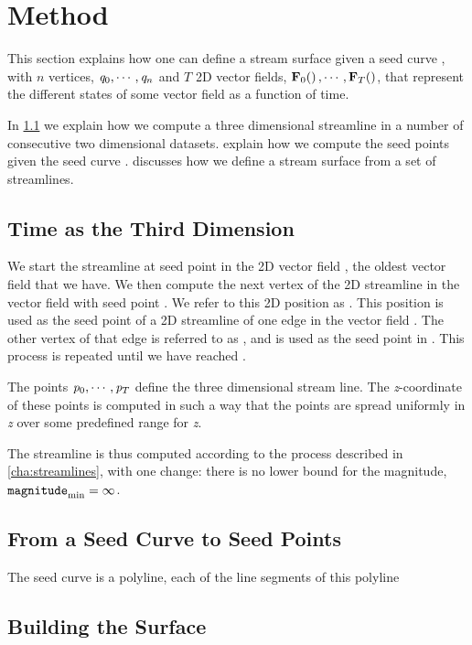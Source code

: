 \section{Method}
\label{s:streamsurfaces:method}
This section explains how one can define a stream surface given a seed curve \seedCurve, with $n$ vertices, $\mathit{q}_{0}, \cdots ,\mathit{q}_{n}$ and $T$ 2D vector fields, $\mathbf{F}_{0}\!\left(\right), \cdots, \mathbf{F}_{T}\!\left(\right)$,  that represent the different states of some vector field as a function of time.


In \cref{s:streamsurface:method:time} we explain how we compute a three dimensional streamline in a number of consecutive two dimensional datasets.  explain how we compute the seed points given the seed curve \seedCurve.  discusses how we define a stream surface from a set of streamlines. 

\subsection{Time as the Third Dimension}
\label{s:streamsurface:method:time}
We start the streamline at seed point  in the 2D vector field , \ie the oldest vector field that we have. We then compute the next vertex of the 2D streamline in the vector field  with seed point . We refer to this 2D position as . This position is used as the seed point of a 2D streamline of one edge in the vector field . The other vertex of that edge is referred to as , and is used as the seed point in . This process is repeated until we have reached . 

The points $\mathit{p}_{0}, \cdots, \mathit{p}_{T}$ define the three dimensional stream line. The \textit{z}-coordinate of these points is computed in such a way that the points are spread uniformly in \textit{z} over some predefined range for \textit{z}.


The streamline is thus computed according to the process described in \cref{cha:streamlines}, with one change: there is no lower bound for the magnitude, \ie $\mathtt{magnitude}_{\text{min}} = \infty$.

\subsection{From a Seed Curve to Seed Points}
\label{s:streamsurface:method:seedCurve}
The seed curve is a polyline, each of the line segments of this polyline


\subsection{Building the Surface}
\label{s:streamsurface:method:surface}

